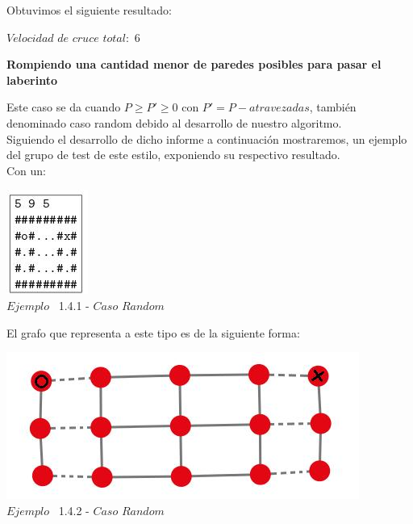  Obtuvimos el siguiente resultado:

$Velocidad$ $de$ $cruce$ $total: $ $6$


\begin{center}
 \textbf{Rompiendo una cantidad menor de paredes posibles para pasar el laberinto}
\end{center}

Este caso se da cuando $P \geq P' \geq 0$ con $P' = P - atravezadas$, tambi\'en denominado caso random debido al desarrollo de nuestro algoritmo.\\

Siguiendo el desarrollo de dicho informe a continuaci\'on mostraremos, un ejemplo del grupo de test de este estilo, exponiendo su respectivo resultado.\\
 
 Con un:
 
\vspace*{0.3cm} \vspace*{0.3cm}
  \begin{center}
 \includegraphics[scale=0.65]{./EJ1/ej1random.jpeg}
\\ {$Ejemplo$ \ 1.4.1 - $Caso$ $Random$}
  \end{center}
  \vspace*{0.3cm}

El grafo que representa a este tipo es de la siguiente forma:\\

\vspace*{0.3cm} \vspace*{0.3cm}
  \begin{center}
 \includegraphics[scale=0.5]{./EJ1/ej1graforandom.jpeg}
 \\{$Ejemplo$ \ 1.4.2 - $Caso$ $Random$}
  \end{center}
  \vspace*{0.3cm}

